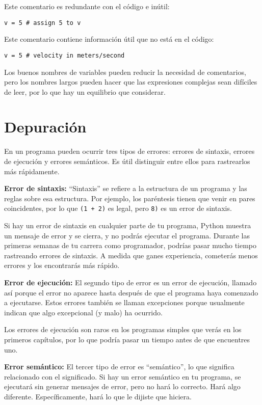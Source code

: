 Este comentario es redundante con el código e inútil:

\begin{lstlisting}
v = 5 # assign 5 to v
\end{lstlisting}

Este comentario contiene información útil que no está en el código:

\begin{lstlisting}
v = 5 # velocity in meters/second
\end{lstlisting}

Los buenos nombres de variables pueden reducir la necesidad de comentarios, pero los nombres largos pueden hacer que las expresiones complejas sean difíciles de leer, por lo que hay un equilibrio que considerar.

\section{Depuración}

En un programa pueden ocurrir tres tipos de errores: errores de sintaxis, errores de ejecución y errores semánticos. Es útil distinguir entre ellos para rastrearlos más rápidamente.

\textbf{Error de sintaxis:} ``Sintaxis'' se refiere a la estructura de un programa y las reglas sobre esa estructura. Por ejemplo, los paréntesis tienen que venir en pares coincidentes, por lo que \texttt{(1 + 2)} es legal, pero \texttt{8)} es un error de sintaxis.

Si hay un error de sintaxis en cualquier parte de tu programa, Python muestra un mensaje de error y se cierra, y no podrás ejecutar el programa. Durante las primeras semanas de tu carrera como programador, podrías pasar mucho tiempo rastreando errores de sintaxis. A medida que ganes experiencia, cometerás menos errores y los encontrarás más rápido.

\textbf{Error de ejecución:} El segundo tipo de error es un error de ejecución, llamado así porque el error no aparece hasta después de que el programa haya comenzado a ejecutarse. Estos errores también se llaman excepciones porque usualmente indican que algo excepcional (y malo) ha ocurrido.

Los errores de ejecución son raros en los programas simples que verás en los primeros capítulos, por lo que podría pasar un tiempo antes de que encuentres uno.

\textbf{Error semántico:} El tercer tipo de error es ``semántico'', lo que significa relacionado con el significado. Si hay un error semántico en tu programa, se ejecutará sin generar mensajes de error, pero no hará lo correcto. Hará algo diferente. Específicamente, hará lo que le dijiste que hiciera.

